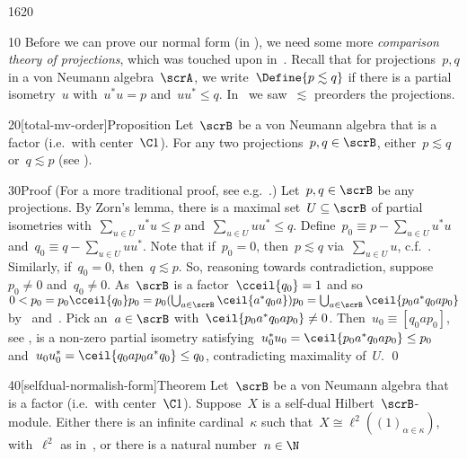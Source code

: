 \begin{parsec}{1620}%
\begin{point}{10}%
Before we can prove our normal form (in ),
    we need some more \emph{comparison theory of projections},
    which was touched upon in~.
Recall that for projections~$p,q$ in a von Neumann algebra~$\scrA$,
    we write~$\Define{p \lesssim q}$ if there is a partial isometry~$u$
    with~$u^*u=p$ and~$uu^* \leq q$.
In~ we saw~$\lesssim$ preorders the projections.
\end{point}
\begin{point}{20}[total-mv-order]{Proposition}%
Let~$\scrB$ be a von Neumann algebra that is a factor (i.e.~with center~$\C 1$).
For any two projections~$p,q \in \scrB$,
    either~$p \lesssim q$ or~$q \lesssim p$ (see ).
\begin{point}{30}{Proof}%
(For a more traditional proof, see e.g.~\cite[prop.~6.2.4]{kr}.)
Let~$p,q \in \scrB$ be any projections.
By Zorn's lemma, there is a maximal
    set~$U\subseteq \scrB$ of partial isometries
    with~$\sum_{u\in U} u^*u \leq p$
    and~$\sum_{u\in U} uu^* \leq q$.
Define~$p_0 \equiv p - \sum_{u\in U} u^*u$
    and~$q_0 \equiv q - \sum_{u \in U} uu^*$.
Note that if~$p_0 = 0$, then~$p \lesssim q$
    via~$\sum_{u \in U} u$, c.f.~.
Similarly, if~$q_0 = 0$, then~$q \lesssim p$.
So, reasoning towards contradiction,
    suppose~$p_0 \neq 0$ and~$q_0 \neq 0$.
As~$\scrB$ is a factor~$\cceil{q_0} = 1$
    and so~$0 < p_0 = p_0\cceil{q_0} p_0 = p_0 (\bigcup_{a \in \scrB} \ceil{a^* q_0 a }) p_0
                = \bigcup_{a \in \scrB} \ceil{p_0a^*q_0ap_0}$
            by~ and~.
Pick an~$a \in \scrB$ with~$\ceil{p_0a^*q_0ap_0} \neq 0$.
Then~$u_0 \equiv [q_0ap_0]$, see ,
    is a non-zero partial isometry
    satisfying~$u_0^*u_0 = \ceil{p_0a^*q_0ap_0} \leq p_0$
    and~$u_0 u_0^* = \ceil{q_0ap_0a^*q_0} \leq q_0$,
    contradicting maximality of~$U$. \qed
\end{point}
\end{point}
\begin{point}{40}[selfdual-normalish-form]{Theorem}%
Let~$\scrB$ be a von Neumann algebra that is a factor (i.e.~with center~$\C 1$).
Suppose~$X$ is a self-dual Hilbert~$\scrB$-module.
Either there is an infinite cardinal~$\kappa$
    such that~$X \cong \ell^2((1)_{\alpha \in \kappa})$,
    with~$\ell^2$ as in~,
    or there is a natural number~$n\in \N$

\end{point}
\end{parsec}
